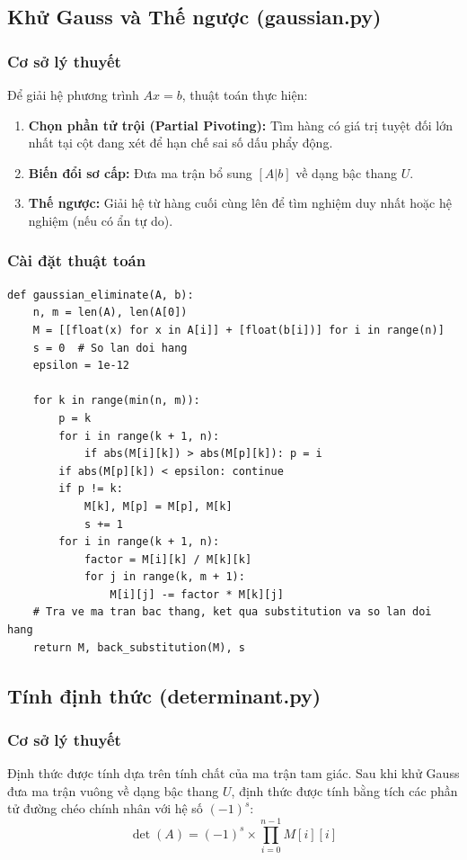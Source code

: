 \documentclass[a4paper,12pt]{article}
\begin{document}
\subsection{Khử Gauss và Thế ngược (gaussian.py)}

\subsubsection{Cơ sở lý thuyết}
Để giải hệ phương trình $Ax = b$, thuật toán thực hiện:
\begin{enumerate}
    \item \textbf{Chọn phần tử trội (Partial Pivoting):} Tìm hàng có giá trị tuyệt đối lớn nhất tại cột đang xét để hạn chế sai số dấu phẩy động.
    \item \textbf{Biến đổi sơ cấp:} Đưa ma trận bổ sung $[A|b]$ về dạng bậc thang $U$.
    \item \textbf{Thế ngược:} Giải hệ từ hàng cuối cùng lên để tìm nghiệm duy nhất hoặc hệ nghiệm (nếu có ẩn tự do).
\end{enumerate}

\subsubsection{Cài đặt thuật toán}
\begin{lstlisting}[caption=Mã nguồn giải hệ phương trình bằng khử Gauss]
def gaussian_eliminate(A, b):
    n, m = len(A), len(A[0])
    M = [[float(x) for x in A[i]] + [float(b[i])] for i in range(n)]
    s = 0  # So lan doi hang
    epsilon = 1e-12

    for k in range(min(n, m)):
        p = k
        for i in range(k + 1, n):
            if abs(M[i][k]) > abs(M[p][k]): p = i
        if abs(M[p][k]) < epsilon: continue
        if p != k:
            M[k], M[p] = M[p], M[k]
            s += 1
        for i in range(k + 1, n):
            factor = M[i][k] / M[k][k]
            for j in range(k, m + 1):
                M[i][j] -= factor * M[k][j]
    # Tra ve ma tran bac thang, ket qua substitution va so lan doi hang
    return M, back_substitution(M), s
\end{lstlisting}

\subsection{Tính định thức (determinant.py)}

\subsubsection{Cơ sở lý thuyết}
Định thức được tính dựa trên tính chất của ma trận tam giác. Sau khi khử Gauss đưa ma trận vuông về dạng bậc thang $U$, định thức được tính bằng tích các phần tử đường chéo chính nhân với hệ số $(-1)^s$:
\begin{equation}
    \det(A) = (-1)^s \times \prod_{i=0}^{n-1} M[i][i]
\end{equation}
\end{document}
